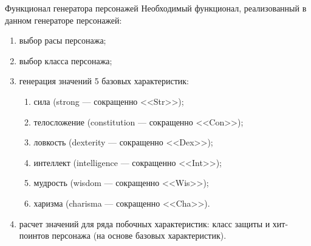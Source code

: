 \documentclass[12pt,a4paper,mathserif]{beamer}
\begin{document}
\begin{frame}{Функционал генератора персонажей}
    \setlength{\parindent}{0.5cm}
    Необходимый функционал, реализованный в данном генераторе персонажей:

    \begin{enumerate}
        \item выбор расы персонажа;
    
        \item выбор класса персонажа;
    
        \item генерация значений 5 базовых характеристик:
    
        \begin{enumerate}
            \item сила (strong --- сокращенно <<Str>>);
            
            \item телосложение (constitution --- сокращенно <<Con>>);
            
            \item ловкость (dexterity --- сокращенно <<Dex>>);
            
            \item интеллект (intelligence --- сокращенно <<Int>>);
            
            \item мудрость (wisdom --- сокращенно <<Wis>>);
            
            \item харизма (charisma --- сокращенно <<Cha>>).
        \end{enumerate}
    
        \item расчет значений для ряда побочных характеристик: класс защиты и хит-поинтов персонажа (на основе базовых характеристик).
    
    
    \end{enumerate}
\end{frame}
\end{document}
